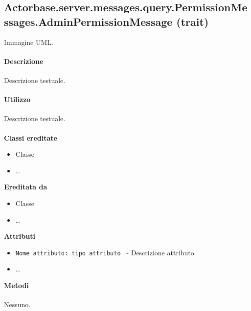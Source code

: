 \documentclass[a4paper]{article}
\begin{document}
	\subsection{Actorbase.server.messages.query.PermissionMessages.AdminPermissionMessage (trait)}
		Immagine UML.
		\\ \\
		\textbf{Descrizione}
			\\ \\
			Descrizione testuale.
			\\ \\
		\textbf{Utilizzo}
			\\ \\
			Descrizione testuale.
			\\ \\
		\textbf{Classi ereditate}
			\begin{itemize}
				\item Classe
				\item \dots
			\end{itemize}
		\textbf{Ereditata da}
			\begin{itemize}
				\item Classe
				\item \dots
			\end{itemize}
		\textbf{Attributi}
			\begin{itemize}
				\item \texttt{Nome attributo: tipo attributo } - Descrizione attributo
				\item \dots
			\end{itemize}
		\textbf{Metodi}
			\\ \\
			Nessuno.
			
\end{document}
